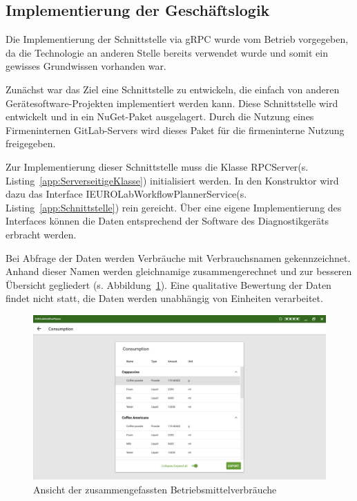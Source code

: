 \subsection{Implementierung der Geschäftslogik}
\label{sec:ImplementierungDerGeschäftslogik}
Die Implementierung der Schnittstelle via {\acs{gRPC}} wurde vom Betrieb vorgegeben, da die Technologie an anderen Stelle bereits verwendet wurde und somit ein gewisses Grundwissen vorhanden war.

Zunächst war das Ziel eine Schnittstelle zu entwickeln, die einfach von anderen Gerätesoftware-Projekten implementiert werden kann. Diese Schnittstelle wird entwickelt und in ein {\acs{NuGet}}-Paket ausgelagert. Durch die Nutzung eines Firmeninternen {\acs{GitLab}}-Servers wird dieses Paket für die firmeninterne Nutzung freigegeben.

Zur Implementierung dieser Schnittstelle muss die Klasse \glqq RPCServer\grqq \space (s. Listing~\ref{app:ServerseitigeKlasse}) initialisiert werden. In den Konstruktor wird dazu das Interface \glqq IEUROLabWorkflowPlannerService\grqq \space (s. Listing~\ref{app:Schnittstelle}) rein gereicht. Über eine eigene Implementierung des Interfaces können die Daten entsprechend der Software des Diagnostikgeräts erbracht werden.

Bei Abfrage der Daten werden Verbräuche mit Verbrauchsnamen gekennzeichnet. Anhand dieser Namen werden gleichnamige zusammengerechnet und zur besseren Übersicht gegliedert (s. Abbildung~\ref{fig:Consumptions}). Eine qualitative Bewertung der Daten findet nicht statt, die Daten werden unabhängig von Einheiten verarbeitet.

\begin{figure}[htb]
	\centering
	\includegraphics[scale=0.5]{Bilder/VerbrauchAnsicht.png}
	\caption{Ansicht der zusammengefassten Betriebsmittelverbräuche}
	\label{fig:Consumptions}
\end{figure}